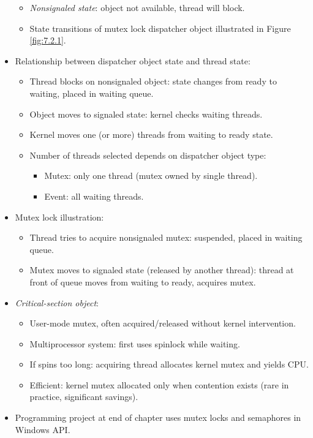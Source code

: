 \begin{itemize}
\begin{itemize}
        \item \textit{Nonsignaled state}: object not available, thread will block.
        \item State transitions of mutex lock dispatcher object illustrated in Figure \ref{fig:7.2.1}.
    \end{itemize}
    \item Relationship between dispatcher object state and thread state:
    \begin{itemize}
        \item Thread blocks on nonsignaled object: state changes from ready to waiting, placed in waiting queue.
        \item Object moves to signaled state: kernel checks waiting threads.
        \item Kernel moves one (or more) threads from waiting to ready state.
        \item Number of threads selected depends on dispatcher object type:
        \begin{itemize}
            \item Mutex: only one thread (mutex owned by single thread).
            \item Event: all waiting threads.
        \end{itemize}
    \end{itemize}
    \item Mutex lock illustration:
    \begin{itemize}
        \item Thread tries to acquire nonsignaled mutex: suspended, placed in waiting queue.
        \item Mutex moves to signaled state (released by another thread): thread at front of queue moves from waiting to ready, acquires mutex.
    \end{itemize}
    \item \textit{Critical-section object}:
    \begin{itemize}
        \item User-mode mutex, often acquired/released without kernel intervention.
        \item Multiprocessor system: first uses spinlock while waiting.
        \item If spins too long: acquiring thread allocates kernel mutex and yields CPU.
        \item Efficient: kernel mutex allocated only when contention exists (rare in practice, significant savings).
    \end{itemize}
    \item Programming project at end of chapter uses mutex locks and semaphores in Windows API.
\end{itemize}

